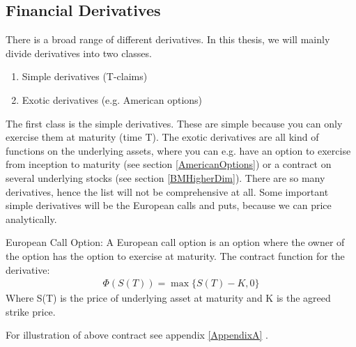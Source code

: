 \subsection{Financial Derivatives}
There is a broad range of different derivatives. In this thesis, we will mainly divide derivatives into two classes. 
\begin{enumerate}
\item Simple derivatives (T-claims)
\item Exotic derivatives (e.g. American options)
\end{enumerate}
The first class is the simple derivatives. These are simple because you can only exercise them at maturity (time T). The exotic derivatives are all kind of functions on the underlying assets, where you can e.g. have an option to exercise from inception to maturity (see section \ref{AmericanOptions}) or a contract on several underlying stocks (see section \ref{BMHigherDim}). There are so many derivatives, hence the list will not be comprehensive at all. Some important simple derivatives will be the European calls and puts, because we can price analytically.

\theoremstyle{definition}
\begin{definition}{European Call Option:}\label{ECall}
A European call option is an option where the owner of the option has the option to exercise at maturity. The contract function for the derivative:
\begin{equation}
\begin{split}
\Phi(S(T))=\max\{S(T)-K, 0\}
\end{split}
\end{equation}
Where S(T) is the price of underlying asset at maturity and K is the agreed strike price.
\end{definition}
For illustration of above contract see appendix \ref{AppendixA} \parencite{finKont}.



